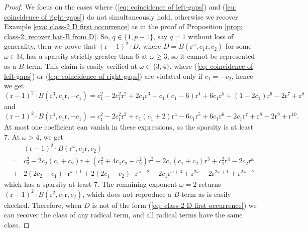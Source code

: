 \documentclass[10pt]{article}
\theoremstyle{remark}%
\theoremstyle{definition}%
\begin{document}
\begin{proof}
We focus on the cases where (\ref{eq: coincidence of left-gaps}) and (\ref{eq: coincidence of right-gaps}) do not simultaneously hold, otherwise we recover Example \ref{exa: class-2 D first occurrence} as in the proof of Proposition \ref{prop: class-2, recover hat-B from D}. So, $q\in\{1,p-1\}$, say $q=1$ without loss of generality, then we prove that 
$(\mathrm{r}-1)^{2}\cdot D$, where $D=B(\mathrm{r}^{\omega},c_{1}\mathrm{r},c_{2})$ for some $\omega\in\mathbb{N}$, has a sparsity strictly greater than $6$ at $\omega\geq 3$, so it cannot be represented as a $B$-term. This claim is easily verified at $\omega\in\{3,4\}$, where (\ref{eq: coincidence of left-gaps}) or (\ref{eq: coincidence of right-gaps}) are violated only if $c_{1}=-c_{2}$, hence we get 
\begin{equation*}
(\mathrm{r}-1)^{2}\cdot B(\mathrm{r}^{3},c_{1}\mathrm{r},-c_{1})
= c_{1}^{2}-2c_{1}^{2}\mathrm{r}^{2}+2c_{1}\mathrm{r}^{3}+c_{1}(c_{1}-6)\mathrm{r}^{4}+6c_{1}\mathrm{r}^{5}+(1-2c_{1})\mathrm{r}^{6}-2\mathrm{r}^{7}+\mathrm{r}^{8}
\end{equation*}
and 
\begin{equation*} 
(\mathrm{r}-1)^{2}\cdot B(\mathrm{r}^{4},c_{1}\mathrm{r},-c_{1})
= c_{1}^{2}-2c_{1}^{2}\mathrm{r}^{2}+c_{1}(c_{1}+2)\mathrm{r}^{4}-6c_{1}\mathrm{r}^{5}+6c_{1}\mathrm{r}^{6}-2c_{1}\mathrm{r}^{7}+\mathrm{r}^{8}-2\mathrm{r}^{9}+\mathrm{r}^{10}.
\end{equation*}
At most one coefficient can vanish in these expressions, so the sparsity is at least $7$. At $\omega > 4$, we get 
\begin{eqnarray*}
& & (\mathrm{r}-1)^{2}\cdot B(\mathrm{r}^{\omega},c_{1}\mathrm{r},c_{2}) \nonumber \\ 
& = & c_{2}^{2}-2c_{2}(c_{1}+c_{2})\mathrm{r}+(c_{1}^{2}+4c_{1}c_{2}+c_{2}^{2})\mathrm{r}^{2}-2c_{1}(c_{1}+c_{2})\mathrm{r}^{3}+c_{1}^{2}\mathrm{r}^{4}-2c_{2}\mathrm{r}^{\omega}\\
& + & 2(2c_{2}-c_{1})\cdot\mathrm{r}^{\omega+1}+2(2c_{1}-c_{2})\cdot\mathrm{r}^{\omega+2}-2c_{1}\mathrm{r}^{\omega+3}+\mathrm{r}^{2\omega}-2\mathrm{r}^{2\omega+1}+\mathrm{r}^{2\omega+2}
\end{eqnarray*}
which has a sparsity at least $7$. The remaining exponent $\omega=2$ returns $(\mathrm{r}-1)^{2}\cdot B(\mathrm{r}^{2},c_{1}\mathrm{r},c_{2})$, which does not reproduce a $B$-term as is easily checked. Therefore, when $D$ is not of the form (\ref{eq: class-2 D first occurrence}) we can recover the class of any radical term, and all radical terms have the same class. 
\end{proof}
\end{document}
